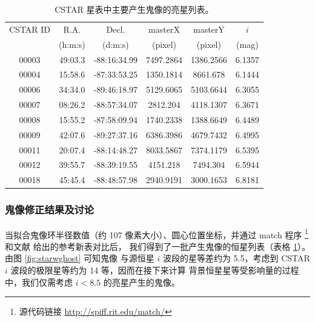 \begin{table}[t]
\centering
\caption{CSTAR 星表中主要产生鬼像的亮星列表。} 
\label{tbl:ghostsource}
\begin{tabular}{cccccc}%
\hline \hline
CSTAR ID	&    R.A.   &   Decl.  	       &    masterX    &   masterY    &    $i$          \\ 
	        	&  (h:m:s) & (d:m:s) 	       &      (pixel)      &     (pixel)      &  (mag)       \\ \hline
00003   	& 49:03.3 & -88:16:34.99 & 7497.2864   & 1386.2566   & 6.1357  	\\
00004   	& 15:58.6 & -87:33:53.25 & 1350.1814   & 8661.678     & 6.1444  	\\
00006   	& 34:34.0 & -89:46:18.97 & 5129.6065   & 5103.6644   & 6.3055  	\\
00007  	& 08:26.2 & -88:57:34.07 & 2812.204     & 4118.1307   & 6.3671  	\\
00008   	& 15:55.2 & -87:58:09.94 & 1740.2338   & 1388.6649   & 6.4489  	\\
00009   	& 42:07.6 & -89:27:37.16 & 6386.3986   & 4679.7432   & 6.4995  	\\
00011  	& 20:07.4 & -88:14:48.27 & 8033.5867   & 7374.1179   & 6.5395  	\\
00012  	& 39:55.7 & -88:39:19.55 & 4151.218     & 7494.304     & 6.5944  	\\
00018  	& 45:45.4 & -88:48:57.98 & 2940.9191   & 3000.1653   & 6.8181  	\\
\hline \hline
\end{tabular}
\end{table}

\subsubsection{鬼像修正结果及讨论}

当拟合鬼像环半径数值（约 107 像素大小）、圆心位置坐标，并通过 match 程序
\footnote{源代码链接 \url{http://spiff.rit.edu/match/}}和文献  给出的参考新表对比后，
我们得到了一批产生鬼像的恒星列表（表格 \ref{tbl:ghostsource}）。由图 \ref{fig:starwghost} 可知鬼像
与源恒星 $i$ 波段的星等差约为 5.5，考虑到 CSTAR $i$ 波段的极限星等约为 14 等，因而在接下来计算
背景恒星星等受影响量的过程中，我们仅需考虑 $i < 8.5$ 的亮星产生的鬼像。

